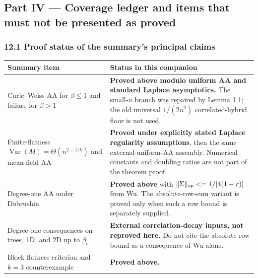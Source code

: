 \subsection{Part IV --- Coverage ledger and items that must not be presented as proved}\label{part-iv-coverage-ledger-and-items-that-must-not-be-presented-as-proved}

\subsubsection{12.1 Proof status of the summary's principal claims}\label{proof-status-of-the-summarys-principal-claims}

{\def\LTcaptype{none} %
\begin{longtable}[]{@{}
  >{\raggedright\arraybackslash}p{}
  >{\raggedright\arraybackslash}p{}@{}}
\toprule\noalign{}
\begin{minipage}[b]{\linewidth}\raggedright
Summary item
\end{minipage} & \begin{minipage}[b]{\linewidth}\raggedright
Status in this companion
\end{minipage} \\
\midrule\noalign{}
\endhead
\bottomrule\noalign{}
\endlastfoot
Curie--Weiss AA for \(\beta\le1\) and failure for \(\beta>1\) & \textbf{Proved above modulo uniform AA and standard Laplace asymptotics.} The small-\(n\) branch was repaired by Lemma 1.1; the old universal \(1/(2n^2)\) correlated-hybrid floor is not used. \\
Finite-flatness \(\operatorname{Var}(M)=\Theta(n^{2-1/k})\) and mean-field AA & \textbf{Proved under explicitly stated Laplace regularity assumptions}, then the same external-uniform-AA assembly. Numerical constants and doubling ratios are not part of the theorem proof. \\
Degree-one AA under Dobrushin & \textbf{Proved above} with \(\|\Sigma\|_{\rm op}\le1/[4(1-r)]\) from Wu. The absolute-row-sum variant is proved only when such a row bound is separately supplied. \\
Degree-one consequences on trees, 1D, and 2D up to \(\beta_c\) & \textbf{External correlation-decay inputs, not reproved here.} Do not cite the absolute row bound as a consequence of Wu alone. \\
Block flatness criterion and \(k=3\) counterexample & \textbf{Proved above.} \\

\end{longtable}}
